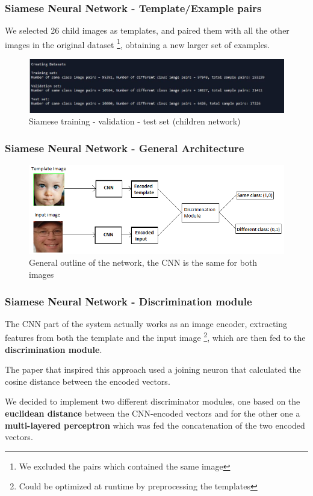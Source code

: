 \documentclass{beamer}
\begin{document}
	\begin{frame}
		\frametitle{Siamese Neural Network - Template/Example pairs}
		We selected 26 child images as templates, and paired them with all the other images in the original dataset \footnote{We excluded the pairs which contained the same image},		
		obtaining a new larger set of examples.
		\begin{figure}
			\centering
			\includegraphics[width=\textwidth]{img/siamese_training_set_children.JPG}
    		\caption{Siamese training - validation - test set (children network)}
    		\label{fig:siamese_general}
		\end{figure}
	\end{frame}
	
	\begin{frame}
		\frametitle{Siamese Neural Network - General Architecture}		
		\begin{figure}
			\centering
			\includegraphics[width=\textwidth]{img/siamese_schema_generale.png}
    		\caption{General outline of the network, the CNN is the same for both images}
    		\label{fig:siamese_dataset}
		\end{figure}
	\end{frame}
	
	\begin{frame}
		\frametitle{Siamese Neural Network - Discrimination module}
		The CNN part of the system actually works as an image encoder, extracting features from both the template and the input image \footnote{Could be optimized at runtime by preprocessing the templates},
		which are then fed to the \textbf{discrimination module}.
		
		The paper that inspired this approach used a joining neuron that calculated the cosine distance between the encoded vectors.
		
		We decided to implement two different discriminator modules, one based on the \textbf{euclidean distance} between the CNN-encoded vectors and for the other one a \textbf{multi-layered perceptron} which was fed the concatenation of the two encoded vectors.
	\end{frame}	
	
\end{document}
